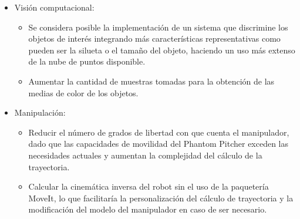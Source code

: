 \begin{itemize}
\item Visión computacional:
    \begin{itemize}
        \item Se considera posible la implementación de un sistema que discrimine los objetos de interés integrando más características representativas como pueden ser la silueta o el tamaño del objeto, haciendo un uso más extenso de la nube de puntos disponible.
        \item Aumentar la cantidad de muestras tomadas para la obtención de las medias de color de los objetos.
    \end{itemize}   
\item Manipulación: 
    \begin{itemize}
        \item Reducir el número de grados de libertad con que cuenta el manipulador, dado que las capacidades de movilidad del Phantom Pitcher exceden las necesidades actuales y aumentan la complejidad del cálculo de la trayectoria.
        \item Calcular la cinemática inversa del robot sin el uso de la paquetería MoveIt, lo que facilitaría la personalización del cálculo de trayectoria y la modificación del modelo del manipulador en caso de ser necesario.
    \end{itemize} 
\end{itemize}

\printbibliography 